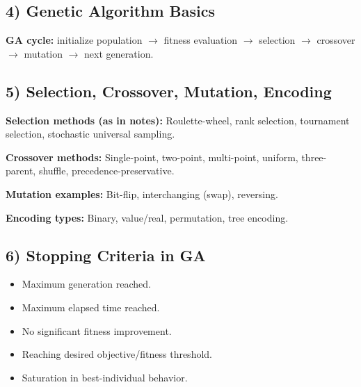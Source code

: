 \documentclass[11pt,a4paper]{article}
\begin{document}
\subsection*{4) Genetic Algorithm Basics}
\textbf{GA cycle:} initialize population $\rightarrow$ fitness evaluation $\rightarrow$ selection $\rightarrow$ crossover $\rightarrow$ mutation $\rightarrow$ next generation.

\begin{center}
\end{center}

\subsection*{5) Selection, Crossover, Mutation, Encoding}
\textbf{Selection methods (as in notes):}
Roulette-wheel, rank selection, tournament selection, stochastic universal sampling.

\textbf{Crossover methods:}
Single-point, two-point, multi-point, uniform, three-parent, shuffle, precedence-preservative.

\textbf{Mutation examples:}
Bit-flip, interchanging (swap), reversing.

\textbf{Encoding types:}
Binary, value/real, permutation, tree encoding.

\subsection*{6) Stopping Criteria in GA}
\begin{itemize}
\item Maximum generation reached.
\item Maximum elapsed time reached.
\item No significant fitness improvement.
\item Reaching desired objective/fitness threshold.
\item Saturation in best-individual behavior.
\end{itemize}
\end{document}
